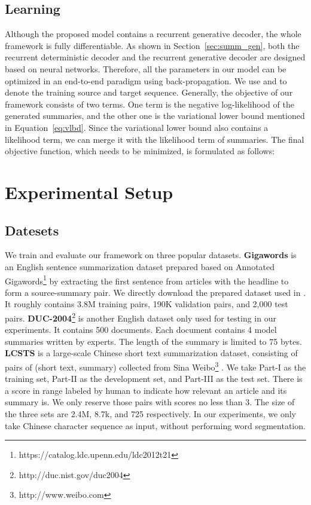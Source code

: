 \documentclass[11pt,letterpaper]{article}
\begin{document}
\subsection{Learning}
Although the proposed model contains a recurrent generative decoder, the whole framework is fully differentiable. As shown in Section~\ref{sec:summ_gen}, both the recurrent deterministic decoder and the recurrent generative decoder are designed based on neural networks. Therefore, all the parameters in our model can be optimized in an end-to-end paradigm using back-propagation.
We use   and  to denote the training source and target sequence.
Generally, the objective of our framework consists of two terms.
One term is the negative log-likelihood of the generated summaries, and the other one is the variational lower bound  mentioned in Equation~\ref{eq:vlbd}.
Since the variational lower bound  also contains a likelihood term, we can merge it with the likelihood term of summaries.
The final objective function, which needs to be minimized, is formulated as follows:
 


\section{Experimental Setup}

\subsection{Datesets}
We train and evaluate our framework on three popular datasets.
\textbf{Gigawords} is an English sentence summarization dataset prepared based on Annotated Gigawords\footnote{https://catalog.ldc.upenn.edu/ldc2012t21} by extracting the first sentence from articles with the headline to form a source-summary pair.
We directly download the prepared dataset  used in \cite{rush2015neural}.
It roughly contains 3.8M training pairs, 190K validation pairs, and 2,000 test pairs.
\textbf{DUC-2004}\footnote{http://duc.nist.gov/duc2004} is another English dataset only used for testing in our experiments. It contains 500 documents. Each document contains 4 model summaries written by experts. The length of the summary is limited to 75 bytes.
\textbf{LCSTS} is a large-scale Chinese short text summarization dataset, consisting of pairs of (short text, summary) collected from Sina Weibo\footnote{http://www.weibo.com} \cite{hu2015lcsts}.
We take Part-I as the training set, Part-II as the development set, and Part-III as the test set. There is a score in range  labeled by human to indicate how relevant an article and its summary is. We only reserve those pairs with scores no less than 3. The size of the three sets are 2.4M, 8.7k, and 725 respectively.
In our experiments, we only take Chinese character sequence as input, without performing word segmentation.
\end{document}
